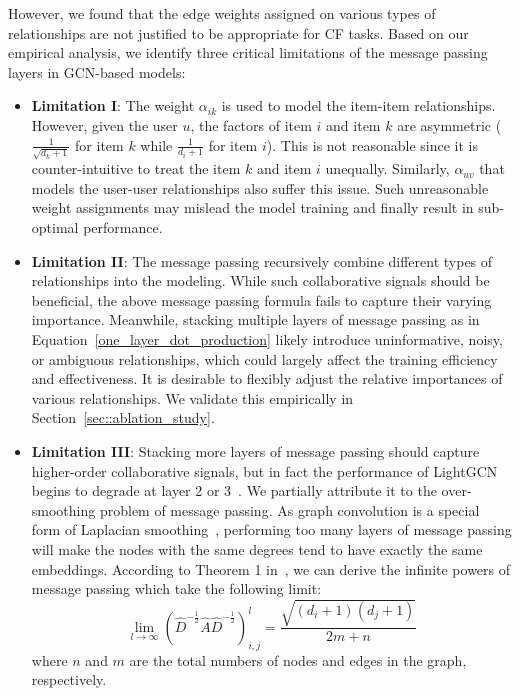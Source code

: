 \documentclass[sigconf,authorversion]{acmart}
\begin{document}
However, we found that the edge weights assigned on various types of relationships are not justified to be appropriate for CF tasks. Based on our empirical analysis, we identify three critical limitations of the message passing layers in GCN-based models: 
\begin{itemize}
	\item \textbf{Limitation I}: The weight $\alpha_{ik}$ is used to model the item-item relationships. However, given the user $u$, the factors of item $i$ and item $k$ are asymmetric ($\frac{1}{\sqrt{d_k + 1}}$ for item $k$ while $\frac{1}{d_i + 1}$ for item $i$). This is not reasonable since it is counter-intuitive to treat the item $k$ and item $i$ unequally. 
	Similarly, $\alpha_{uv}$ that models the user-user relationships also suffer this issue. Such unreasonable weight assignments may mislead the model training and finally result in sub-optimal performance.
	\item \textbf{Limitation II}: The message passing recursively combine different types of relationships into the modeling. While such collaborative signals should be beneficial, the above message passing formula fails to capture their varying importance. Meanwhile, stacking multiple layers of message passing as in Equation~\ref{one_layer_dot_production} likely introduce uninformative, noisy, or ambiguous relationships, which could largely affect the training efficiency and effectiveness. It is desirable to flexibly adjust the relative importances of various relationships. We validate this empirically in Section~\ref{sec::ablation_study}.
    \item \textbf{Limitation III}: Stacking more layers of message passing should capture higher-order collaborative signals, but in fact the performance of LightGCN begins to degrade at layer 2 or 3~\cite{LightGCN}. We partially attribute it to the over-smoothing problem of message passing. As graph convolution is a special form of Laplacian smoothing~\cite{deeper_insights_GCN}, performing too many layers of message passing will make the nodes with the same degrees tend to have exactly the same embeddings. According to Theorem 1 in~\cite{GCNII}, we can derive the infinite powers of message passing which take the following limit:
    \begin{equation}
    	 \lim_{l \to \infty} (\hat{D}^{-\frac{1}{2}}\hat{A}\hat{D}^{-\frac{1}{2}})^{l}_{i, j} = \frac{\sqrt{(d_i + 1)(d_j + 1)}}{2m + n}
    	 \label{infinite_mp}
    \end{equation}
    where $n$ and $m$ are the total numbers of nodes and edges in the graph, respectively.
        





\end{itemize}
\end{document}
